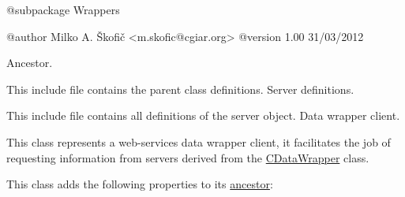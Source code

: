 \begin{DoxyVerb} @subpackage        Wrappers

 @author            Milko A. Škofič <m.skofic@cgiar.org>
 @version   1.00 31/03/2012\end{DoxyVerb}


Ancestor.

This include file contains the parent class definitions. Server definitions.

This include file contains all definitions of the server object. Data wrapper client.

This class represents a web-\/services data wrapper client, it facilitates the job of requesting information from servers derived from the \hyperlink{class_c_data_wrapper}{C\-Data\-Wrapper} class.

This class adds the following properties to its \hyperlink{class_c_wrapper_client}{ancestor}\-:


